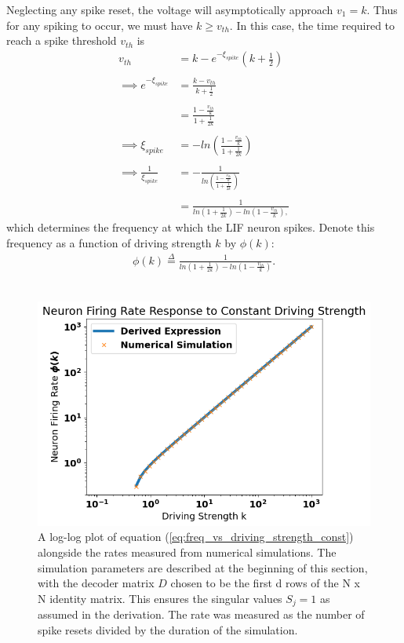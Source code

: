 \begin{enumerate}
Neglecting any spike reset, the voltage will asymptotically approach $v_1=k$. Thus for any spiking to occur, we must have $k \geq v_{th}$. In this case, the time required to reach a spike threshold $v_{th}$ is 
\begin{align*}
v_{th} &=  k - e^{-\xi_{spike}} (k + \frac{1}{2})
\\
\\
\implies 
e^{-\xi_{spike}} &=  \frac{k - v_{th}}{k + \frac{1}{2}}
\\
\\
&= \frac{1 - \frac{v_{th}}{k}} {1 + \frac{1}{2k}}\\
\\
 \implies
 \xi_{spike} &= - ln
 \left(
 \frac{1 - \frac{v_{th}}{k}} {1 + \frac{1}{2k}}
  \right)
 \\
 \\
 \implies 
 \frac{1}{\xi_{spike}} &= - \frac{1}{ 
 ln
 \left(
 \frac{1 - \frac{v_{th}}{k}} {1 + \frac{1}{2k}}
  \right)
 } \\
 \\
 &=   \frac{1}{ 
 ln \left(
  1 + \frac{1}{2k}
  \right) 
  -
 ln
 \left(
 1 - \frac{v_{th}}{k}\right),
 }
\end{align*}
which determines the frequency  at which the LIF neuron spikes.  Denote this frequency as a function of driving strength $k$ by $\phi(k)$:
\begin{align}
\label{eq:freq_vs_driving_strength_const}
\phi(k) \overset{\Delta}{=}  \frac{1}{ 
 ln \left(
  1 + \frac{1}{2k}
  \right) 
  -
 ln
 \left(
 1 - \frac{v_{th}}{k}\right)
 }.
\end{align}
\\

\begin{figure}
\centering
\includegraphics[width=\linewidth]{figures/phi_vs_k_const_driving.png}
\caption{A log-log plot of equation (\ref{eq:freq_vs_driving_strength_const}) alongside the rates measured from numerical simulations. The simulation parameters are described at the beginning of this section, with the decoder matrix $D$ chosen to be the first d rows of the N x N identity matrix. This ensures the singular values $S_j = 1$ as assumed in the derivation.   The rate was measured as the number of spike resets divided by the duration of the simulation. }\label{fig:spike_rate_vs_k_const_driving}
\end{figure}


\end{enumerate}
